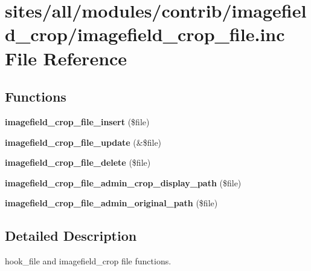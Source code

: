 \hypertarget{imagefield__crop__file_8inc}{
\section{sites/all/modules/contrib/imagefield\_\-crop/imagefield\_\-crop\_\-file.inc File Reference}
\label{imagefield__crop__file_8inc}
}
\subsection*{Functions}
\begin{CompactItemize}
\item 
\hypertarget{imagefield__crop__file_8inc_f04567d4e2fd367e8ec02f375abebb5d}{
\textbf{imagefield\_\-crop\_\-file\_\-insert} (\$file)}
\label{imagefield__crop__file_8inc_f04567d4e2fd367e8ec02f375abebb5d}

\item 
\hypertarget{imagefield__crop__file_8inc_9968db7de213d5a7fdb9aa360b41f863}{
\textbf{imagefield\_\-crop\_\-file\_\-update} (\&\$file)}
\label{imagefield__crop__file_8inc_9968db7de213d5a7fdb9aa360b41f863}

\item 
\hypertarget{imagefield__crop__file_8inc_eb3bdc08f556c70d70d2967c759af839}{
\textbf{imagefield\_\-crop\_\-file\_\-delete} (\$file)}
\label{imagefield__crop__file_8inc_eb3bdc08f556c70d70d2967c759af839}

\item 
\hypertarget{imagefield__crop__file_8inc_6c8efdce15fc9c111480618f7dd77020}{
\textbf{imagefield\_\-crop\_\-file\_\-admin\_\-crop\_\-display\_\-path} (\$file)}
\label{imagefield__crop__file_8inc_6c8efdce15fc9c111480618f7dd77020}

\item 
\hypertarget{imagefield__crop__file_8inc_62629ee63cc0847d0231a9bea5ae2e53}{
\textbf{imagefield\_\-crop\_\-file\_\-admin\_\-original\_\-path} (\$file)}
\label{imagefield__crop__file_8inc_62629ee63cc0847d0231a9bea5ae2e53}

\end{CompactItemize}


\subsection{Detailed Description}
hook\_\-file and imagefield\_\-crop file functions. 
